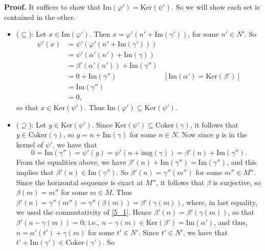 \documentclass[9pt]{article}
\newcommand{\Ker}{\text{Ker}}
\newcommand{\Coker}{\text{Coker}}
\newcommand{\im}{\text{Im}}
\begin{document}
\begin{enumerate}
      \textbf{Proof.} It suffices to show that
      $\im(\varphi') = \Ker(\psi')$. So we will show each set is
      contained in the other.
      \begin{itemize}
         \item ($\subseteq$): Let $x \in \im(\varphi')$. Then
               $x = \varphi'(n' + \im(\gamma'))$, for some $n' \in N'$. So
               \begin{align*}
                  \psi'(x) &= \psi'(\varphi'(n' + \im(\gamma'))) \\
                     &= \psi'(\alpha'(n') + \im(\gamma)) \\
                     &= \beta'(\alpha'(n')) + \im(\gamma'') \\
                     &= 0 + \im(\gamma'')
                        &[\im(\alpha') = \Ker(\beta')] \\
                     &= \im(\gamma'') \\
                     &= 0,
               \end{align*}
               so that $x \in \Ker(\psi')$. Thus 
               $\im(\varphi') \subseteq \Ker(\psi')$.
         \item ($\supseteq$): Let $y \in \Ker(\psi')$. Since
               $\Ker(\psi') \subseteq \Coker(\gamma)$, it follows that
               $y \in \Coker(\gamma)$, so $y = n + \im(\gamma)$ for some
               $n \in N$. Now since $y$ is in the kernel of $\psi'$, we have
               that
               $$0 = \im(\gamma'') = \psi'(y) =
                 \psi'(n + \text{img}(\gamma)) =
                 \beta'(n) + \im(\gamma'').$$
               From the equalities above, we have
               $\beta'(n) + \im(\gamma'') = \im(\gamma'')$, and this
               implies that $\beta'(n) \in \im(\gamma'')$. So
               $\beta'(n) = \gamma''(m'')$ for some $m'' \in M''$. Since the
               horizontal sequence is exact at $M''$, it follows that $\beta$ is
               surjective, so $\beta(m) = m''$ for some $m \in M$. Thus
               $\beta'(n) = \gamma''(m'') = \gamma''(\beta(m)) =
                \beta'(\gamma(m))$, where, in last equality, we used the
               commutativity of \eqref{5_1}. Hence
               $\beta'(n) = \beta'(\gamma(m))$, so that
               $\beta'(n - \gamma(m)) = 0$; i.e.,
               $n - \gamma(m) \in \Ker(\beta') = \im(\alpha')$, and
               thus, $n = \alpha'(t') + \gamma(m)$ for some $t' \in N'$. Since
               $t' \in N'$, we have that
               $t' + \im(\gamma') \in \Coker(\gamma')$. So

\end{itemize}
\end{enumerate}
\end{document}
